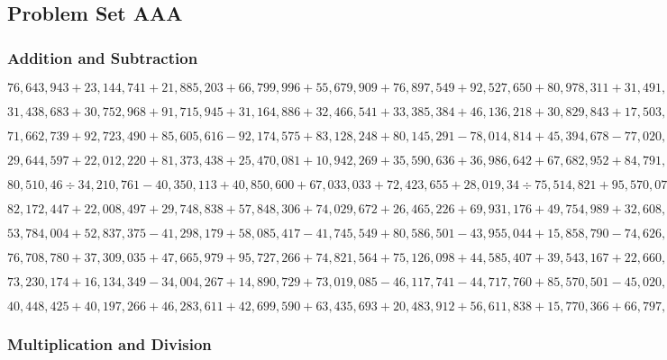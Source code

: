 \hypertarget{problem-set-aaa-19}{%
\subsection{Problem Set AAA}\label{problem-set-aaa-19}}

\hypertarget{addition-and-subtraction-375}{%
\subsubsection{Addition and
Subtraction}\label{addition-and-subtraction-375}}

\(76,643,943+23,144,741+21,885,203+66,799,996+55,679,909+76,897,549+92,527,650+80,978,311+31,491,437+91,491,729\)

\(31,438,683+30,752,968+91,715,945+31,164,886+32,466,541+33,385,384+46,136,218+30,829,843+17,503,655+79,206,717\)

\(71,662,739+92,723,490+85,605,616-92,174,575+83,128,248+80,145,291-78,014,814+45,394,678-77,020,375-98,062,804\)

\(29,644,597+22,012,220+81,373,438+25,470,081+10,942,269+35,590,636+36,986,642+67,682,952+84,791,938+39,133,148\)

\(80,510,46÷34,210,761-40,350,113+40,850,600+67,033,033+72,423,655+28,019,34÷75,514,821+95,570,071-26,159,066\)

\(82,172,447+22,008,497+29,748,838+57,848,306+74,029,672+26,465,226+69,931,176+49,754,989+32,608,365+30,593,990\)

\(53,784,004+52,837,375-41,298,179+58,085,417-41,745,549+80,586,501-43,955,044+15,858,790-74,626,800+63,946,825\)

\(76,708,780+37,309,035+47,665,979+95,727,266+74,821,564+75,126,098+44,585,407+39,543,167+22,660,031+35,144,006\)

\(73,230,174+16,134,349-34,004,267+14,890,729+73,019,085-46,117,741-44,717,760+85,570,501-45,020,883+72,173,746\)

\(40,448,425+40,197,266+46,283,611+42,699,590+63,435,693+20,483,912+56,611,838+15,770,366+66,797,787+70,596,546\)

\hypertarget{multiplication-and-division-374}{%
\subsubsection{Multiplication and
Division}\label{multiplication-and-division-374}}

